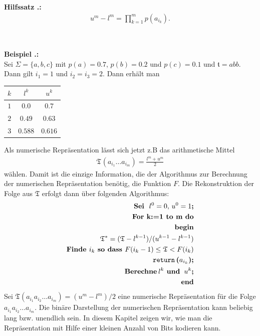 \documentclass[a4paper,12pt]{article}
\newcounter{Hilfssatz}
\newcounter{Beispiel}
\newcounter{Algorithmus}
\newenvironment{Hilfssatz}{
\medskip
        
        \setlength{\parindent}{0pt}
        \addtocounter{Hilfssatz}{1}
        \textbf{\textsf{Hilfssatz \thesubsection.\theHilfssatz}:}\\}{
        \nopagebreak
        \vspace{-1.0ex}
        \bigskip\\
}
\newenvironment{Beispiel}{
\medskip
        
        \setlength{\parindent}{0pt}
        \addtocounter{Beispiel}{1}
        \textbf{\textsf{Beispiel \thesubsection.\theBeispiel}:}\\}{
        \nopagebreak
        \vspace{-1.0ex}
        \bigskip
        
}
\begin{document}
\begin{Hilfssatz}
\begin{align*}
u^{m} - l^{m} = \prod_{k=1}^{m}p(a_{i_{k}}).
\end{align*}
\end{Hilfssatz}
\begin{Beispiel}
Sei $\Sigma = \{a,b,c\}$ mit $p(a)=0.7$, $p(b) =0.2$ und $p(c)=0.1$ und $\mathfrak{t}=abb$.
Dann gilt $i_1=1$ und $i_2=i_3 =2$.
Dann erhält man
\begin{center}
\begin{tabular}{c|c|c}
$k$ & $l^k$ & $u^k$
\\
\hline
$1$ & $0.0$ & $0.7$
\\
\hline
$2$ & $0.49$ & $ 0.63$ 
\\
\hline
$3$ & $0.588$ & $0.616$
\end{tabular}
\end{center}
\end{Beispiel}
Als numerische Repräsentation lässt sich jetzt z.B das arithmetische Mittel
\begin{align*}
\mathfrak{T}^{}(a_{i_{1}}\ldots a_{i_{m}})= \frac{l^{m} + u^{m}}{2}
\end{align*}
wählen. Damit ist die einzige Information, die der Algorithmus zur Berechnung der numerischen Repräsentation benötig, die Funktion $F$. Die Rekonstruktion der Folge aus $\mathfrak{T}$ erfolgt dann über folgenden Algorithmus:
\begin{align*}
\textbf{\text{Sei}\; $l^{0}=0,\,u^{0}=1$;}
\\
\textbf{\text{For k:=1 to m do}}
\\
\textbf{\text{begin}}
\\
\mathfrak{T}^{*}= (\mathfrak{T} - l^{k-1}) / (u^{k-1} - l^{k-1})
\\
\textbf{\text{Finde $i_k$ so dass $F(i_k -1) \leq \mathfrak{T} < F(i_k)$}}
\\
\textbf{\text{{\tt{return}}}\,($a_{i_{k}}$);}
\\
 \textbf{\text{Berechne}\,$l^{k}$ \textbf{und}\, $u^{k}$;}
\\
\textbf{\text{end}}
\end{align*}
Sei $\mathfrak{T}(a_{i_{1}}a_{i_{2}}\ldots a_{i_{m}}) = (u^{m} - l^{m})/2$ eine numerische Repräsentation für die Folge $a_{i_{1}}a_{i_{2}}\ldots a_{i_{m}}$. Die binäre Darstellung der numerischen Repräsentation kann  beliebig lang bzw. unendlich sein. In diesem Kapitel zeigen wir, wie man die Repräsentation mit Hilfe einer kleinen Anzahl von Bits kodieren kann. 
\end{document}
